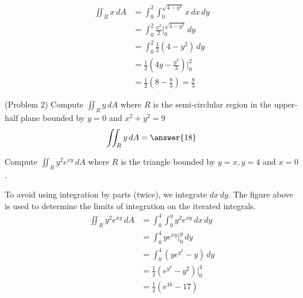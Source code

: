 \documentclass[handout]{ximera}
\begin{document}
\begin{example}[Example 2]
\begin{align*}
\iint_R x \, dA & = \int_0^2 \int_0^{\sqrt{4 - y^2}} x \, dx \, dy\\
                 & = \int_0^2  \frac{x^2}{2} \bigg|_{0}^{\sqrt{4 - y^2}} \, dy\\
                 & = \int_0^2  \frac12(4-y^2) \, dy\\
                 &= \frac12 \left(4y - \frac{y^3}{3}\right)  \bigg|_0^2\\
                 &= \frac12 \left(8 - \frac83\right) = \frac{8}{3}
\end{align*} 


\end{example}

\begin{problem}(Problem 2)
Compute $\iint_R y \, dA$ where $R$ is the semi-circlular region in the upper-half plane bounded by $y=0$ and $x^2 + y^2 = 9$
\[
\iint_R y \, dA = \answer{18}
\]
\end{problem}


\begin{example}[Example 3]
Compute $\iint_R y^2 e^{xy} \, dA$ where $R$ is the triangle bounded by $y = x, y=4$ and $x=0$.\\

\begin{image}
\end{image}

To avoid using integration by parts (twice), we integrate $dx\, dy$.  
The figure above is used to determine the limits of integration on the iterated integrals.
\begin{align*}
\iint_R y^2 e^{xy} \, dA & = \int_0^4 \int_0^{y} y^2 e^{xy} \, dx \, dy\\
                 & = \int_0^4 y e^{xy} \bigg|_{0}^{y} \, dy\\
                 & = \int_0^4  \left(ye^{y^2} - y \right)\, dy\\
                 &= \frac12 \left(e^{y^2} - y^2\right) \bigg|_0^4\\
                 &= \frac12 \left(e^{16} - 17\right)
\end{align*} 

\end{example}
\end{document}
